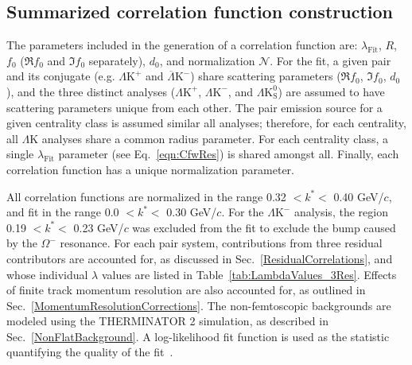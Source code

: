 \documentclass[ALICE,manyauthors]{cernphprep}
\newcommand{\LamK}{$\Lambda$K\xspace}
\newcommand{\LamKchP}{$\Lambda\mathrm{K^{+}}$\xspace}
\newcommand{\ALamKchM}{$\overline{\Lambda}\mathrm{K^{-}}$\xspace}
\newcommand{\LamKchM}{$\Lambda\mathrm{K^{-}}$\xspace}
\newcommand{\LamKs}{$\Lambda\mathrm{K^{0}_{S}}$\xspace}
\begin{document}
\subsection{Summarized correlation function construction}
\label{SummarizedFitProcedure}

The parameters included in the generation of a correlation function are: $\lambda_{\mathrm{Fit}}$, $R$, $f_{0}$ ($\Re f_{0}$ and $\Im f_{0}$ separately), $d_{0}$, and normalization $\mathcal{N}$.
For the fit, a given pair and its conjugate (e.g.{\color{blue}{,}} \LamKchP and \ALamKchM) share scattering parameters ($\Re f_{0}$, $\Im f_{0}$, $d_{0}$), and the three distinct analyses (\LamKchP, \LamKchM, and \LamKs) are assumed to have scattering parameters unique from each other.
The pair emission source for a given centrality class is assumed similar {\color{red}{between}} {\color{blue}{among}} all analyses; therefore, for each centrality, all \LamK analyses share a common radius parameter.
For each centrality class, a single $\lambda_{\mathrm{Fit}}$ parameter (see Eq.~\ref{eqn:CfwRes}) is shared amongst all.
Finally, each correlation function has a unique normalization parameter{}.

All {\color{blue}{experimental}} correlation functions are normalized in the range 0.32 $< k^{*} <$ 0.40 GeV/$c$, and fit in the range 0.0 $< k^{*} <$ 0.30 GeV/$c$.
For the \LamKchM analysis, the region 0.19 $< k^{*} <$ 0.23 GeV/$c$ was excluded from the fit to exclude the bump caused by the $\Omega^{-}$ resonance.
For each pair system, contributions from three residual contributors are accounted for, as discussed in Sec.~\ref{ResidualCorrelations}, and whose individual $\lambda$ values are listed in Table~\ref{tab:LambdaValues_3Res}.
Effects of finite track momentum resolution are also accounted for, as outlined in Sec.~\ref{MomentumResolutionCorrections}.
The non-femtoscopic backgrounds are modeled using the THERMINATOR 2 simulation, as described in Sec.~\ref{NonFlatBackground}.
A log-likelihood fit function is used as the statistic quantifying the quality of the fit~\cite{Lisa:2005dd}.
\end{document}
